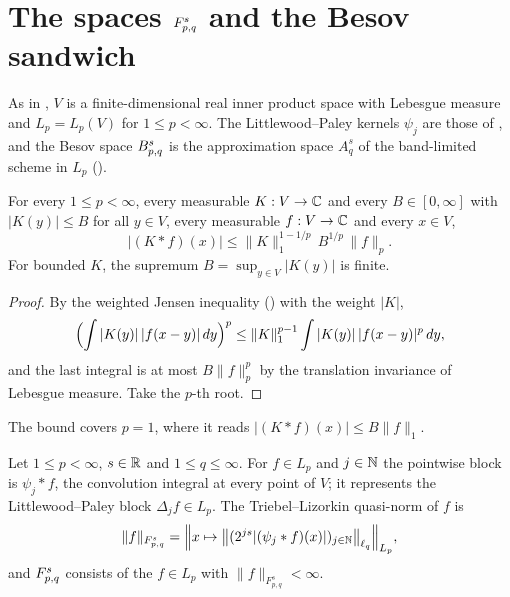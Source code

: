\section{The spaces \texorpdfstring{$F^{s}_{p,q}$}{F\^{}s\_\{p,q\}} and the Besov sandwich}
\label{sec:tl-besov-sandwich}

As in , $V$ is a finite-dimensional real inner product space with Lebesgue measure
and $L_p = L_p(V)$ for $1 \leq p < \infty$. The Littlewood--Paley kernels $\psi_j$ are those of
, and the Besov space $B^{s}_{p,q}$ is the approximation space $A^s_q$
of the band-limited scheme in $L_p$ ().

\begin{lemma}
\label{lem:conv-pointwise-bound}
\leanok
{}
For every $1 \leq p < \infty$, every measurable $K : V \to \mathbb{C}$ and every $B \in [0, \infty]$ with
$|K(y)| \leq B$ for all $y \in V$, every measurable $f : V \to \mathbb{C}$ and every $x \in V$,
\[
  |(K * f)(x)| \leq \|K\|_1^{1 - 1/p} \, B^{1/p} \, \|f\|_p .
\]
For bounded $K$, the supremum $B = \sup_{y \in V} |K(y)|$ is finite.
\end{lemma}

\begin{proof}
\leanok
By the weighted Jensen inequality () with the weight $|K|$,
\[
  \Bigl( \int |K(y)| \, |f(x - y)| \, dy \Bigr)^p
  \leq \|K\|_1^{p-1} \int |K(y)| \, |f(x - y)|^p \, dy ,
\]
and the last integral is at most $B \|f\|_p^p$ by the translation invariance of Lebesgue
measure. Take the $p$-th root.
\end{proof}

The bound covers $p = 1$, where it reads $|(K * f)(x)| \leq B \|f\|_1$.

\begin{definition}
\label{def:triebel-lizorkin}
\leanok
{}
Let $1 \leq p < \infty$, $s \in \mathbb{R}$ and $1 \leq q \leq \infty$. For $f \in L_p$ and $j \in \mathbb{N}$ the
pointwise block is $\psi_j * f$, the convolution integral at every point of $V$; it represents
the Littlewood--Paley block $\Delta_j f \in L_p$. The Triebel--Lizorkin quasi-norm of $f$ is
\[
  \|f\|_{F^s_{p,q}} = \Bigl\| x \mapsto \bigl\| (2^{js} |(\psi_j * f)(x)|)_{j \in \mathbb{N}}
  \bigr\|_{\ell_q} \Bigr\|_{L_p},
\]
and $F^{s}_{p,q}$ consists of the $f \in L_p$ with $\|f\|_{F^s_{p,q}} < \infty$.
\end{definition}

